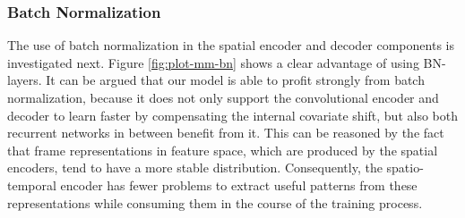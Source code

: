 \subsubsection*{Batch Normalization}

The use of batch normalization in the spatial encoder and decoder components is investigated next. Figure \ref{fig:plot-mm-bn} shows a clear advantage of using BN-layers. It can be argued that our model is able to profit strongly from batch normalization, because it does not only support the convolutional encoder and decoder to learn faster by compensating the internal covariate shift, but also both recurrent networks in between benefit from it. This can be reasoned by the fact that frame representations in feature space, which are produced by the spatial encoders, tend to have a more stable distribution. Consequently, the spatio-temporal encoder has fewer problems to extract useful patterns from these representations while consuming them in the course of the training process.

